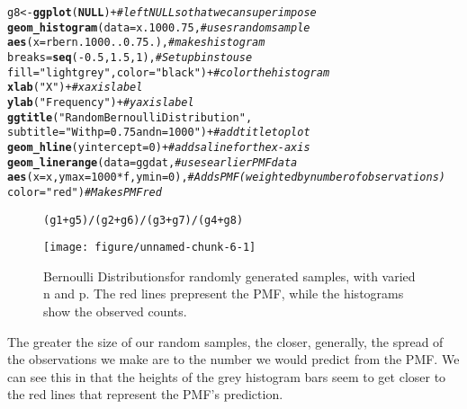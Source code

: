 \documentclass{article}\usepackage[]{graphicx}\usepackage[]{color}
\makeatletter
\def\maxwidth{ %
  \ifdim\Gin@nat@width>\linewidth
    \linewidth
  \else
    \Gin@nat@width
  \fi
}
\newcommand{\hlnum}[1]{\textcolor[rgb]{0.686,0.059,0.569}{#1}}%
\newcommand{\hlstr}[1]{\textcolor[rgb]{0.192,0.494,0.8}{#1}}%
\newcommand{\hlcom}[1]{\textcolor[rgb]{0.678,0.584,0.686}{\textit{#1}}}%
\newcommand{\hlopt}[1]{\textcolor[rgb]{0,0,0}{#1}}%
\newcommand{\hlstd}[1]{\textcolor[rgb]{0.345,0.345,0.345}{#1}}%
\newcommand{\hlkwa}[1]{\textcolor[rgb]{0.161,0.373,0.58}{\textbf{#1}}}%
\newcommand{\hlkwb}[1]{\textcolor[rgb]{0.69,0.353,0.396}{#1}}%
\newcommand{\hlkwc}[1]{\textcolor[rgb]{0.333,0.667,0.333}{#1}}%
\newcommand{\hlkwd}[1]{\textcolor[rgb]{0.737,0.353,0.396}{\textbf{#1}}}%
\newenvironment{kframe}{%
 \def\at@end@of@kframe{}%
 \ifinner\ifhmode%
  \def\at@end@of@kframe{\end{minipage}}%
  \begin{minipage}{\columnwidth}%
 \fi\fi%
 \def\FrameCommand##1{\hskip\@totalleftmargin \hskip-\fboxsep
 \colorbox{shadecolor}{##1}\hskip-\fboxsep
     \hskip-\linewidth \hskip-\@totalleftmargin \hskip\columnwidth}%
 \MakeFramed {\advance\hsize-\width
   \@totalleftmargin\z@ \linewidth\hsize
   \@setminipage}}%
 {\par\unskip\endMakeFramed%
 \at@end@of@kframe}
\newenvironment{knitrout}{}{} %
\makeatother
\begin{document}
\begin{enumerate}
\begin{knitrout}
\begin{kframe}
\begin{alltt}
\hlstd{g8}\hlkwb{<-}\hlkwd{ggplot}\hlstd{(}\hlkwa{NULL}\hlstd{)} \hlopt{+}                                      \hlcom{#left NULL so that we can superimpose}
  \hlkwd{geom_histogram}\hlstd{(}\hlkwc{data}\hlstd{=x.1000.75,}                        \hlcom{#uses random sample}
                 \hlkwd{aes}\hlstd{(}\hlkwc{x}\hlstd{=rbern.1000..0.75.),}               \hlcom{#makes histogram}
                 \hlkwc{breaks}\hlstd{=}\hlkwd{seq}\hlstd{(}\hlopt{-}\hlnum{0.5}\hlstd{,}\hlnum{1.5}\hlstd{,}\hlnum{1}\hlstd{),}                \hlcom{#Set up bins to use}
                 \hlkwc{fill} \hlstd{=} \hlstr{"lightgrey"}\hlstd{,} \hlkwc{color}\hlstd{=}\hlstr{"black"}\hlstd{)} \hlopt{+}   \hlcom{#color the histogram}
  \hlkwd{xlab}\hlstd{(}\hlstr{"X"}\hlstd{)} \hlopt{+}                                           \hlcom{#x axis label}
  \hlkwd{ylab}\hlstd{(}\hlstr{"Frequency"}\hlstd{)}\hlopt{+}                                    \hlcom{#y axis label}
  \hlkwd{ggtitle}\hlstd{(}\hlstr{"Random Bernoulli Distribution"}\hlstd{,}
          \hlkwc{subtitle} \hlstd{=} \hlstr{"With p=0.75 and n=1000"}\hlstd{)} \hlopt{+}        \hlcom{#add title to plot}
  \hlkwd{geom_hline}\hlstd{(}\hlkwc{yintercept}\hlstd{=}\hlnum{0}\hlstd{)} \hlopt{+}                            \hlcom{#adds a line for the x-axis}
  \hlkwd{geom_linerange}\hlstd{(}\hlkwc{data}\hlstd{=ggdat,}                            \hlcom{#uses earlier PMF data}
                 \hlkwd{aes}\hlstd{(}\hlkwc{x}\hlstd{=x,} \hlkwc{ymax}\hlstd{=}\hlnum{1000}\hlopt{*}\hlstd{f,} \hlkwc{ymin}\hlstd{=}\hlnum{0}\hlstd{),}         \hlcom{#Adds PMF (weighted by number of observations)}
                 \hlkwc{color}\hlstd{=}\hlstr{"red"}\hlstd{)}                           \hlcom{#Makes PMF red}
\end{alltt}
\end{kframe}
\end{knitrout}
\begin{figure}[H]
\centering
\begin{knitrout}
\color{fgcolor}\begin{kframe}
\begin{alltt}
\hlstd{(g1} \hlopt{+} \hlstd{g5)} \hlopt{/} \hlstd{(g2} \hlopt{+} \hlstd{g6)} \hlopt{/} \hlstd{(g3} \hlopt{+} \hlstd{g7)} \hlopt{/} \hlstd{(g4} \hlopt{+} \hlstd{g8)}
\end{alltt}
\end{kframe}
\texttt{[image: figure/unnamed-chunk-6-1]} 
\end{knitrout}
\caption{Bernoulli Distributionsfor randomly generated samples, with varied n and p.  The red lines prepresent the PMF, while the histograms show the observed counts.}
\label{BernRand}
\end{figure}
  The greater the size of our random samples, the closer, generally, the spread of the observations we make are to the number we would predict from the PMF.  We can see this in that the heights of the grey histogram bars seem to get closer to the red lines that represent the PMF's prediction.
\end{enumerate}

\end{document}

